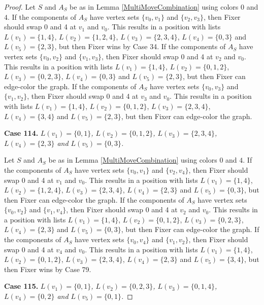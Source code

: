 \documentclass[12pt]{amsart}
\theoremstyle{plain}
\theoremstyle{definition}
\theoremstyle{remark}
\begin{document}
\begin{proof}
Let $S$ and $A_S$ be as in Lemma \ref{MultiMoveCombination} using colors $0$ and $4$. If the components of $A_S$ have vertex sets $\{v_0, v_1\}$ and $\{v_2, v_3\}$, then Fixer should swap 0 and 4 at $v_1$ and $v_0$. This results in a position with lists $L(v_1) = \{1, 4\}$, $L(v_2) = \{1, 2, 4\}$, $L(v_3) = \{2, 3, 4\}$, $L(v_4) = \{0, 3\}$ and $L(v_5) = \{2, 3\}$, but then Fixer wins by Case 34.
If the components of $A_S$ have vertex sets $\{v_0, v_2\}$ and $\{v_1, v_3\}$, then Fixer should swap 0 and 4 at $v_2$ and $v_0$. This results in a position with lists $L(v_1) = \{1, 4\}$, $L(v_2) = \{0, 1, 2\}$, $L(v_3) = \{0, 2, 3\}$, $L(v_4) = \{0, 3\}$ and $L(v_5) = \{2, 3\}$, but then Fixer can edge-color the graph.
If the components of $A_S$ have vertex sets $\{v_0, v_3\}$ and $\{v_1, v_2\}$, then Fixer should swap 0 and 4 at $v_3$ and $v_0$. This results in a position with lists $L(v_1) = \{1, 4\}$, $L(v_2) = \{0, 1, 2\}$, $L(v_3) = \{2, 3, 4\}$, $L(v_4) = \{3, 4\}$ and $L(v_5) = \{2, 3\}$, but then Fixer can edge-color the graph.

\noindent\textbf{Case 114.  }\textit{$L(v_1) = \{0, 1\}$, $L(v_2) = \{0, 1, 2\}$, $L(v_3) = \{2, 3, 4\}$, $L(v_4) = \{2, 3\}$ and $L(v_5) = \{0, 3\}$.}

Let $S$ and $A_S$ be as in Lemma \ref{MultiMoveCombination} using colors $0$ and $4$. If the components of $A_S$ have vertex sets $\{v_0, v_1\}$ and $\{v_2, v_4\}$, then Fixer should swap 0 and 4 at $v_1$ and $v_0$. This results in a position with lists $L(v_1) = \{1, 4\}$, $L(v_2) = \{1, 2, 4\}$, $L(v_3) = \{2, 3, 4\}$, $L(v_4) = \{2, 3\}$ and $L(v_5) = \{0, 3\}$, but then Fixer can edge-color the graph.
If the components of $A_S$ have vertex sets $\{v_0, v_2\}$ and $\{v_1, v_4\}$, then Fixer should swap 0 and 4 at $v_2$ and $v_0$. This results in a position with lists $L(v_1) = \{1, 4\}$, $L(v_2) = \{0, 1, 2\}$, $L(v_3) = \{0, 2, 3\}$, $L(v_4) = \{2, 3\}$ and $L(v_5) = \{0, 3\}$, but then Fixer can edge-color the graph.
If the components of $A_S$ have vertex sets $\{v_0, v_4\}$ and $\{v_1, v_2\}$, then Fixer should swap 0 and 4 at $v_4$ and $v_0$. This results in a position with lists $L(v_1) = \{1, 4\}$, $L(v_2) = \{0, 1, 2\}$, $L(v_3) = \{2, 3, 4\}$, $L(v_4) = \{2, 3\}$ and $L(v_5) = \{3, 4\}$, but then Fixer wins by Case 79.

\noindent\textbf{Case 115.  }\textit{$L(v_1) = \{0, 1\}$, $L(v_2) = \{0, 2, 3\}$, $L(v_3) = \{0, 1, 4\}$, $L(v_4) = \{0, 2\}$ and $L(v_5) = \{0, 1\}$.}


\end{proof}
\end{document}
